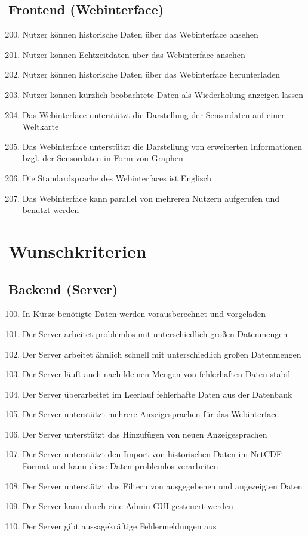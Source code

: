 \subsection{Frontend (Webinterface)}
\begin{enumerate}[label=\textbf{MK\arabic{enumi}0}]
	\setcounter{enumi}{199}
	\item Nutzer können historische Daten über das Webinterface ansehen
	\item Nutzer können Echtzeitdaten über das Webinterface ansehen
	\item Nutzer können historische Daten über das Webinterface herunterladen
	\item Nutzer können kürzlich beobachtete Daten als Wiederholung anzeigen lassen
	\item Das Webinterface unterstützt die Darstellung der Sensordaten auf einer Weltkarte
	\item Das Webinterface unterstützt die Darstellung von erweiterten Informationen bzgl. der Sensordaten in Form von Graphen
	\item Die Standardsprache des Webinterfaces ist Englisch
	\item Das Webinterface kann parallel von mehreren Nutzern aufgerufen und benutzt werden
\end{enumerate}

\section{Wunschkriterien}
\subsection{Backend (Server)}
\begin{enumerate}[label=\textbf{WK\arabic{enumi}0}]
	\setcounter{enumi}{99}
	\item In Kürze benötigte Daten werden vorausberechnet und vorgeladen
	\item Der Server arbeitet problemlos mit unterschiedlich großen Datenmengen
	\item Der Server arbeitet ähnlich schnell mit unterschiedlich großen Datenmengen
	\item Der Server läuft auch nach kleinen Mengen von fehlerhaften Daten stabil
	\item Der Server überarbeitet im Leerlauf fehlerhafte Daten aus der Datenbank
	\item Der Server unterstützt mehrere Anzeigesprachen für das Webinterface
	\item Der Server unterstützt das Hinzufügen von neuen Anzeigesprachen
	\item Der Server unterstützt den Import von historischen Daten im NetCDF-Format und kann diese Daten problemlos verarbeiten
	\item Der Server unterstützt das Filtern von ausgegebenen und angezeigten Daten
	\item Der Server kann durch eine Admin-GUI gesteuert werden
	\item Der Server gibt aussagekräftige Fehlermeldungen aus
\end{enumerate}
